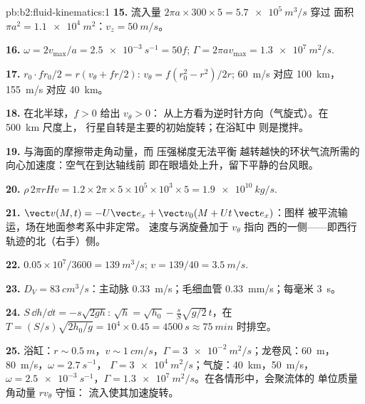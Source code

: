 \begin{solution}{pb:b2:fluid-kinematics:1}
\textbf{15.} 流入量 $2\pi a \times 300 \times 5 = \qty{5.7e5}{m^3/s}$ 穿过
面积 $\pi a^2 = \qty{1.1e4}{m^2}$：$v_z = \qty{50}{m/s}$。

\textbf{16.} $\omega = 2v_{\max}/a = \qty{2.5e-3}{s^{-1}} = 50f$; $\Gamma = 2\pi av_{\max}
= \qty{1.3e7}{m^2/s}$.

\textbf{17.} $r_0\cdot fr_0/2 = r(v_\theta + fr/2)$: $v_\theta = f(r_0^2 - r^2)/2r$;
\qty{60}{m/s} 对应 \qty{100}{km}，\qty{155}{m/s} 对应 \qty{40}{km}。

\textbf{18.} 在北半球，$f > 0$ 给出 $v_\theta > 0$：
从上方看为逆时针方向（气旋式）。在 \qty{500}{km} 尺度上，
行星自转是主要的初始旋转；在浴缸中
则是搅拌。

\textbf{19.} 与海面的摩擦带走角动量，而
压强梯度无法平衡
越转越快的环状气流所需的向心加速度：空气在到达轴线前
即在眼墙处上升，留下平静的台风眼。

\textbf{20.} $\rho\,2\pi rHv = 1.2 \times 2\pi \times 5 \times 10^5 \times 10^3 \times 5 =
\qty{1.9e10}{kg/s}$.

\textbf{21.} $\vect v(M, t) = -U\vect e_x + \vect v_0(M + Ut\,\vect e_x)$：图样
被平流输运，场在地面参考系中非定常。
速度与涡旋叠加于 $v_\theta$ 指向
西的一侧——即西行轨迹的北（右手）侧。

\textbf{22.} $0.05 \times 10^7/3600 = \qty{139}{m^3/s}$; $v = 139/40 = \qty{3.5}{m/s}$.

\textbf{23.} $D_V = \qty{83}{cm^3/s}$：主动脉 \qty{0.33}{m/s}；毛细血管
\qty{0.33}{mm/s}；每毫米 \qty{3}{s}。

\textbf{24.} $S\,\dd h/\dd t = -s\sqrt{2gh}$: $\sqrt h = \sqrt{h_0} -
\frac sS\sqrt{g/2}\,t$，在 $T = (S/s)\sqrt{2h_0/g} = 10^4 \times 0.45 =
\qty{4500}{s} \approx \qty{75}{min}$ 时排空。

\textbf{25.} 浴缸：$r \sim \qty{0.5}{m}$，$v \sim \qty{1}{cm/s}$，$\Gamma =
\qty{3e-2}{m^2/s}$；龙卷风：\qty{60}{m}，\qty{80}{m/s}，$\omega = \qty{2.7}{s^{-1}}$，
$\Gamma = \qty{3e4}{m^2/s}$；气旋：\qty{40}{km}，\qty{50}{m/s}，$\omega =
\qty{2.5e-3}{s^{-1}}$，$\Gamma = \qty{1.3e7}{m^2/s}$。在各情形中，会聚流体的
单位质量角动量 $rv_\theta$ 守恒：
流入使其加速旋转。
\end{solution}
